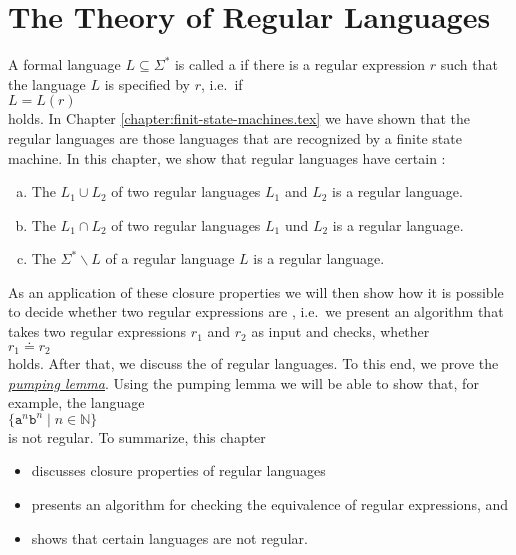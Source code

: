 \chapter{The Theory of Regular Languages \label{chapter:regulaere-sprachen}}
A formal language $L \subseteq \Sigma^*$ is called a  
if there is a regular expression $r$ such that the language $L$ is specified by $r$, i.e.~if
\\[0.2cm]
\hspace*{1.3cm}
$L = L(r)$ 
\\[0.2cm]
holds.  In Chapter \ref{chapter:finit-state-machines.tex} we have shown that the regular languages
are those languages that are recognized by a finite state machine.  In this chapter, we show
that regular languages have certain :
\begin{enumerate}[(a)]
\item The  $L_1 \cup L_2$ of two regular languages $L_1$ and $L_2$ is a regular language.
\item The  $L_1 \cap L_2$ of two regular languages $L_1$ und $L_2$ is a regular language.
\item The   $\Sigma^* \backslash L$ of a regular language $L$ is a regular language.
\end{enumerate}
As an application of these closure properties we will then show how it is possible to decide whether two
regular expressions are , i.e.~we present an algorithm that takes two regular expressions
$r_1$ and $r_2$ as input and checks, whether 
\\[0.2cm]
\hspace*{1.3cm}
$r_1 \doteq r_2$
\\[0.2cm]
holds.  After that, we discuss the  of regular languages.  To this end, we prove the
\href{http://en.wikipedia.org/wiki/Pumping_lemma_for_regular_languages}{\emph{pumping lemma}}.
Using the pumping lemma we will be able to show that, for example, the language
\\[0.2cm]
\hspace*{1.3cm} $\{ \mathtt{a}^n \mathtt{b}^n \mid n \in \mathbb{N} \}$
\\[0.2cm]
is not regular.  To summarize, this chapter 
\begin{itemize}
\item discusses closure properties of regular languages
\item presents an algorithm for checking the equivalence of regular expressions, and
\item shows that certain languages are not regular.
\end{itemize}


